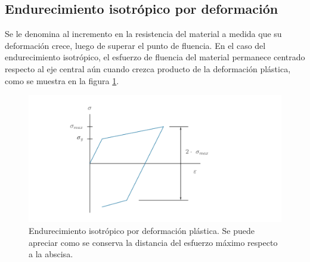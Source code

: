 \subsection{Endurecimiento isotrópico por deformación}
Se le denomina al incremento en la resistencia del material a medida que su deformación crece, luego de superar el punto de fluencia. En el caso del endurecimiento isotrópico, el esfuerzo de fluencia del material permanece centrado respecto al eje central aún cuando crezca producto de la deformación plástica, como se muestra en la figura \ref{fig:iso_hard}.

\begin{figure}[h]
\centering
\includegraphics[width=1\linewidth]{Imagenes/iso_hard.pdf}
\caption{Endurecimiento isotrópico por deformación plástica. Se puede apreciar como se conserva la distancia del esfuerzo máximo respecto a la abscisa.}
\label{fig:iso_hard}
\end{figure}


